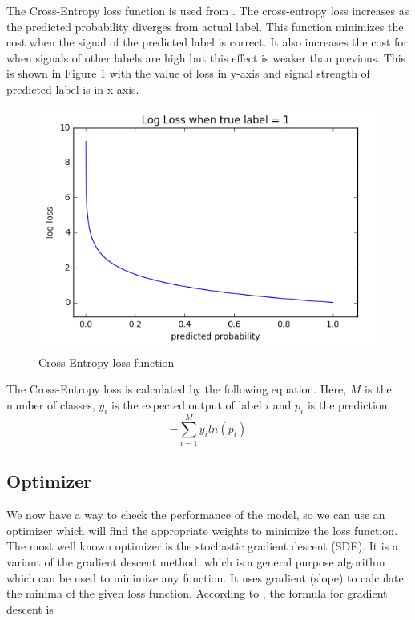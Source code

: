 \documentclass[a4paper,oneside,12pt]{report}
\begin{document}
The Cross-Entropy loss function is used from \citep{lossfunc}. The cross-entropy loss increases as the predicted probability diverges from actual label. This function minimizes the cost when the signal of the predicted label is correct. It also increases the cost for when signals of other labels are high but this effect is weaker than previous. This is shown in Figure \ref{fig:orgedb8979} with the value of loss in y-axis and signal strength of predicted label is in x-axis.

\begin{figure}[htbp]
\centering
\includegraphics[width=.9\linewidth]{Neural_Network/2025-04-27_00-39-04_cross_entropy.png}
\caption{\label{fig:orgedb8979}Cross-Entropy loss function}
\end{figure}

The Cross-Entropy loss is calculated by the following equation. Here, \(M\) is the number of classes, \(y_i\) is the expected output of label \(i\) and \(p_i\) is the prediction.
\[ - \sum_{i = 1}^{M} y_{i} ln (p_{i}) \]

\subsection{Optimizer}
\label{sec:org6530441}
We now have a way to check the performance of the model, so we can use an optimizer which will find the appropriate weights to minimize the loss function. The most well known optimizer is the stochastic gradient descent (SDE). It is a variant of the gradient descent method, which is a general purpose algorithm which can be used to minimize any function.  It uses gradient (slope) to calculate the minima of the given loss function. According to \citep{gradientdescent}, the formula for gradient descent is
\end{document}
